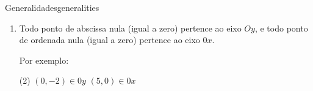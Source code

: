 \begin{proposition}{Generalidades}{generalities}
\begin{enumerate}
    \vspace{.2cm}
    \begin{tasks}(2)
      \task[\#] $(4,2) \in Q_1$
      \task[\#] $(-\frac{1}{2},9) \in Q_2$ 
      \task[\#] $(-3,-5) \in Q_3$
      \task[\#] $(\frac{3}{2},-1) \in Q_4$
    \end{tasks}

    Os pontos dos eixos coordenados não pertencem a nenhum quadrante.

    \item Todo ponto de abscissa nula (igual a zero) pertence ao eixo $Oy$, e todo ponto de ordenada nula 
      (igual a zero) pertence ao eixo $0x$.

      \vspace{.2cm}
      Por exemplo:

      \vspace{.2cm}
      \begin{tasks}(2)
        \task[\#] $(0,-2) \in 0y$
        \task[\#] $(5,0) \in 0x$
      \end{tasks}
  \end{enumerate} 
\end{proposition}

